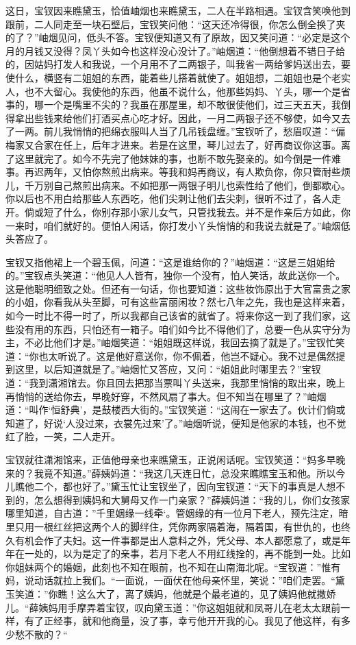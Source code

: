 \documentclass[12pt,oneside]{book}
\begin{document}
这日，宝钗因来瞧黛玉，恰值岫烟也来瞧黛玉，二人在半路相遇。宝钗含笑唤他到跟前，二人同走至一块石壁后，宝钗笑问他：“这天还冷得很，你怎么倒全换了夹的了？”岫烟见问，低头不答。宝钗便知道又有了原故，因又笑问道：“必定是这个月的月钱又没得？凤丫头如今也这样没心没计了。”岫烟道：“他倒想着不错日子给的，因姑妈打发人和我说，一个月用不了二两银子，叫我省一两给爹妈送出去，要使什么，横竖有二姐姐的东西，能着些儿搭着就使了。姐姐想，二姐姐也是个老实人，也不大留心。我使他的东西，他虽不说什么，他那些妈妈、丫头，哪一个是省事的，哪一个是嘴里不尖的？我虽在那屋里，却不敢很使他们，过三天五天，我倒得拿出些钱来给他们打酒买点心吃才好。因此，一月二两银子还不够使，如今又去了一两。前儿我悄悄的把绵衣服叫人当了几吊钱盘缠。”宝钗听了，愁眉叹道：“偏梅家又合家在任上，后年才进来。若是在这里，琴儿过去了，好再商议你这事。离了这里就完了。如今不先完了他妹妹的事，也断不敢先娶亲的。如今倒是一件难事。再迟两年，又怕你熬煎出病来。等我和妈再商议，有人欺负你，你只管耐些烦儿，千万别自己熬煎出病来。不如把那一两银子明儿也索性给了他们，倒都歇心。你以后也不用白给那些人东西吃，他们尖刺让他们去尖刺，很听不过了，各人走开。倘或短了什么，你别存那小家儿女气，只管找我去。并不是作亲后方如此，你一来时，咱们就好的。便怕人闲话，你打发小丫头悄悄的和我说去就是了。”岫烟低头答应了。

宝钗又指他裙上一个碧玉佩，问道：“这是谁给你的？”岫烟道：“这是三姐姐给的。”宝钗点头笑道：“他见人人皆有，独你一个没有，怕人笑话，故此送你一个。这是他聪明细致之处。但还有一句话，你也要知道：这些妆饰原出于大官富贵之家的小姐，你看我从头至脚，可有这些富丽闲妆？然七八年之先，我也是这样来着，如今一时比不得一时了，所以我都自己该省的就省了。将来你这一到了我们家，这些没有用的东西，只怕还有一箱子。咱们如今比不得他们了，总要一色从实守分为主，不必比他们才是。”岫烟笑道：“姐姐既这样说，我回去摘了就是了。”宝钗忙笑道：“你也太听说了。这是他好意送你，你不佩着，他岂不疑心。我不过是偶然提到这里，以后知道就是了。”岫烟忙又答应，又问：“姐姐此时哪里去？”宝钗道：“我到潇湘馆去。你且回去把那当票叫丫头送来，我那里悄悄的取出来，晚上再悄悄的送给你去，早晚好穿，不然风扇了事大。但不知当在哪里了？”岫烟道：“叫作‘恒舒典’，是鼓楼西大街的。”宝钗笑道：“这闹在一家去了。伙计们倘或知道了，好说‘人没过来，衣裳先过来’了。”岫烟听说，便知是他家的本钱，也不觉红了脸，一笑，二人走开。

宝钗就往潇湘馆来，正值他母亲也来瞧黛玉，正说闲话呢。宝钗笑道：“妈多早晚来的？我竟不知道。”薛姨妈道：“我这几天连日忙，总没来瞧瞧宝玉和他。所以今儿瞧他二个，都也好了。”黛玉忙让宝钗坐了，因向宝钗道：“天下的事真是人想不到的，怎么想得到姨妈和大舅母又作一门亲家？”薛姨妈道：“我的儿，你们女孩家哪里知道，自古道：”千里姻缘一线牵‘。管姻缘的有一位月下老人，预先注定，暗里只用一根红丝把这两个人的脚绊住，凭你两家隔着海，隔着国，有世仇的，也终久有机会作了夫妇。这一件事都是出人意料之外，凭父母、本人都愿意了，或是年年在一处的，以为是定了的亲事，若月下老人不用红线拴的，再不能到一处。比如你姐妹两个的婚姻，此刻也不知在眼前，也不知在山南海北呢。“宝钗道：”惟有妈，说动话就拉上我们。“一面说，一面伏在他母亲怀里，笑说：”咱们走罢。“黛玉笑道：”你瞧！这么大了，离了姨妈，他就是个最老道的，见了姨妈他就撒娇儿。“薛姨妈用手摩弄着宝钗，叹向黛玉道：”你这姐姐就和凤哥儿在老太太跟前一样，有了正经事，就和他商量，没了事，幸亏他开开我的心。我见了他这样，有多少愁不散的？“
\end{document}
